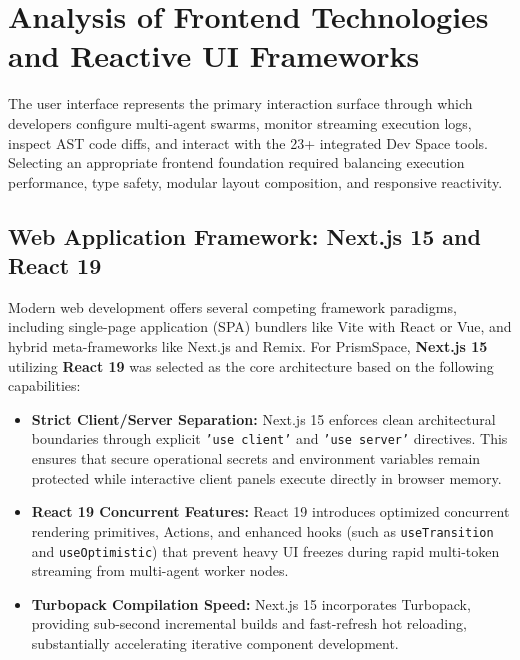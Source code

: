 \documentclass[12pt,a4paper]{report}
\begin{document}
\section{Analysis of Frontend Technologies and Reactive UI Frameworks}
The user interface represents the primary interaction surface through which developers configure multi-agent swarms, monitor streaming execution logs, inspect AST code diffs, and interact with the 23+ integrated Dev Space tools. Selecting an appropriate frontend foundation required balancing execution performance, type safety, modular layout composition, and responsive reactivity.

\subsection{Web Application Framework: Next.js 15 and React 19}
Modern web development offers several competing framework paradigms, including single-page application (SPA) bundlers like Vite with React or Vue, and hybrid meta-frameworks like Next.js and Remix. For PrismSpace, \textbf{Next.js 15} utilizing \textbf{React 19} was selected as the core architecture based on the following capabilities:
\begin{itemize}
    \item \textbf{Strict Client/Server Separation:} Next.js 15 enforces clean architectural boundaries through explicit \texttt{'use client'} and \texttt{'use server'} directives. This ensures that secure operational secrets and environment variables remain protected while interactive client panels execute directly in browser memory.
    \item \textbf{React 19 Concurrent Features:} React 19 introduces optimized concurrent rendering primitives, Actions, and enhanced hooks (such as \texttt{useTransition} and \texttt{useOptimistic}) that prevent heavy UI freezes during rapid multi-token streaming from multi-agent worker nodes.
    \item \textbf{Turbopack Compilation Speed:} Next.js 15 incorporates Turbopack, providing sub-second incremental builds and fast-refresh hot reloading, substantially accelerating iterative component development.
\end{itemize}
\end{document}
